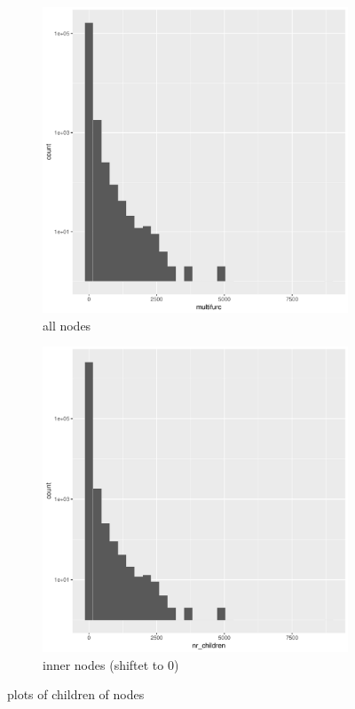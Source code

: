       \begin{figure}
        \begin{subfigure}{.5\textwidth}
          \centering
          \includegraphics[width=.8\linewidth]{Figures/multifurc.pdf}
          \caption{all nodes}
          \label{fig:childrenOfNodes_allNodes}
        \end{subfigure}%
        \begin{subfigure}{.5\textwidth}
          \centering
          \includegraphics[width=.8\linewidth]{Figures/nr_children.pdf}
          \caption{inner nodes (shiftet to 0)}
          \label{fig:childrenOfNodes_innerNodes}
        \end{subfigure}
        \caption{plots of children of nodes}
        \label{fig:childrenOfNodes}
      \end{figure}

